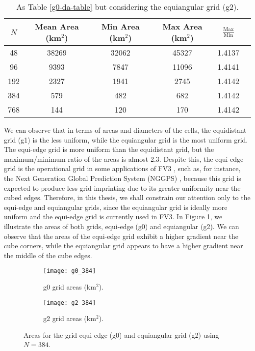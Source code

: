\begin{table}[htbp]
    \centering
    \caption{As Table \ref{g0-da-table} but considering the equiangular grid (g2). \label{g2-da-table}}
    \begin{tabular}{cccccc}
        \toprule
        $N$ & Mean Area (km$^2$) & Min Area (km$^2$) & Max Area (km$^2$) & $\frac{\text{Max}}{\text{Min}}$ \\
        \midrule
        48 & 38269 & 32062 & 45327 & 1.4137 \\
        96 & 9393 & 7847 & 11096 & 1.4141 \\
        192 & 2327 & 1941 & 2745 & 1.4142 \\
        384 & 579 & 482 & 682 & 1.4142 \\
        768 & 144 & 120 & 170 & 1.4142 \\
        \bottomrule
    \end{tabular}
\end{table}


We can observe that in terms of areas and diameters of the cells, the equidistant grid (g1) is the less uniform,
while the equiangular grid  is the most uniform grid.
The equi-edge grid is more uniform than the equidistant grid, but the maximum/minimum ratio of the areas is almost 2.3. 
Despite this, the equi-edge grid is the operational grid in some applications of FV3 \citep{harris:2021,chen:2021}, such as, for instance, 
the Next Generation Global Prediction System (NGGPS) \citep{zhou:2019}, 
because this grid is expected to produce less grid imprinting due to its greater uniformity near the cubed edges.
Therefore, in this thesis, we shall constrain our attention only to the  equi-edge and equiangular grids, since the equiangular grid is ideally more uniform and the equi-edge grid  is currently used in FV3.
In Figure \ref{chp-cs-areas}, we illustrate the areas of both grids, equi-edge (g0) and equiangular (g2).
We can observe that the areas of the equi-edge grid exhibit a higher gradient near the cube corners, while the equiangular grid appears to have a higher gradient near the middle of the cube edges.
\begin{figure}[!htb]
	\centering
	\begin{subfigure}{0.48\textwidth}
		\texttt{[image: g0\_384]}
		\caption{g0 grid areas (km$^2$).}
	\end{subfigure}
	\begin{subfigure}{0.48\textwidth}
		\centering
		\texttt{[image: g2\_384]}
		\caption{g2 grid areas (km$^2$).}
	\end{subfigure}
	\caption{Areas for the grid equi-edge (g0) and equiangular grid (g2) using $N=384$.\label{chp-cs-areas}}
\end{figure}


